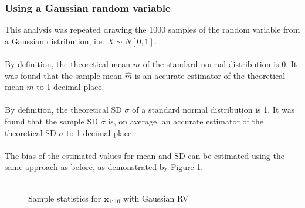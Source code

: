 \subsubsection{Using a Gaussian random variable}
This analysis was repeated drawing the 1000 samples of the random variable from a Gaussian distribution, i.e.  $X \sim \textit{N}[0,1]$. 
\\\\
By definition, the theoretical mean $m$ of the standard normal distribution is 0. It was found that the sample mean $\hat{m}$ is an accurate estimator of the theoretical mean $m$ to 1 decimal place.
\\\\
By definition, the theoretical SD $\sigma$ of a standard normal distribution is 1. It was found that the sample SD $\hat{\sigma}$ is, on average, an accurate estimator of the theoretical SD $\sigma$ to 1 decimal place.
\\\\
The bias of the estimated values for mean and SD can be estimated using the same approach as before, as demonstrated by Figure \ref{fig:samplevals2}.
\\\\
\begin{figure}[H]
    \centering
    \caption{Sample statistics for $\textbf{x}_{1:10}$ with Gaussian RV}
    \label{fig:samplevals2}
\end{figure}

